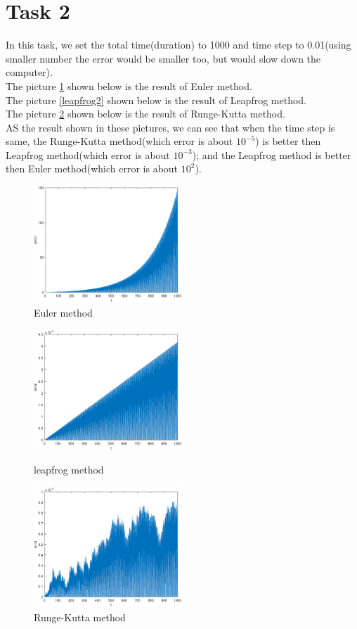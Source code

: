 \documentclass[12pt]{article}%
\begin{document}
\section{Task 2}
In this task, we set the total time(duration) to 1000 and time step to 0.01(using smaller number the error would be smaller too, but would slow down the computer).\\
The picture \ref{euler2} shown below is the result of Euler method.
\\
The picture \ref{leapfrog2} shown below is the result of Leapfrog method.
\\
The picture \ref{rk2} shown below is the result of Runge-Kutta method.
\\
AS the result shown in these pictures, we can see that when the time step is same, the Runge-Kutta method(which error is about \({10^{ - 5}}\)) is better then Leapfrog method(which error is about \({10^{ - 3}}\)); and the Leapfrog method is better then Euler method(which error is about \({10^{2}}\)).

\begin{figure}  
\centering  
\includegraphics[width=2.2in]{euler2.eps} 
\caption{Euler method}  
\label{euler2}
\end{figure}
\begin{figure}
\begin{minipage}[t]{0.5\textwidth}
\centering
\includegraphics[width=2.2in]{leapfrog2.eps}
\caption{leapfrog method}
\label{leapfrog2}
\end{minipage}%
\begin{minipage}[t]{0.5\textwidth}
\centering
\includegraphics[width=2.2in]{rk2.eps}
\caption{Runge-Kutta method}
\label{rk2}
\end{minipage}
\end{figure}
\newpage
\end{document}
